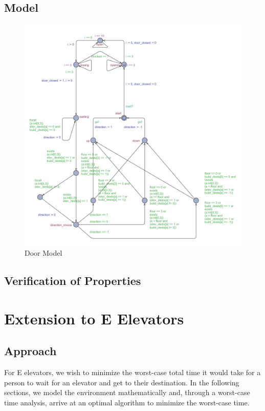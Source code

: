 \documentclass[letterpaper]{article} %
\begin{document}
\subsection{Model}

\begin{figure}
  \centering
    \includegraphics[scale=0.6]{door}
  \caption{Door Model}
\end{figure}

\subsection{Verification of Properties}

\section{Extension to E Elevators}

\subsection{Approach}
For E elevators, we wish to minimize the worst-case total time it would take for a person to wait for an elevator and get to their destination. In the following sections, we model the environment mathematically and, through a worst-case time analysis, arrive at an optimal algorithm to minimize the worst-case time. 
\end{document}
